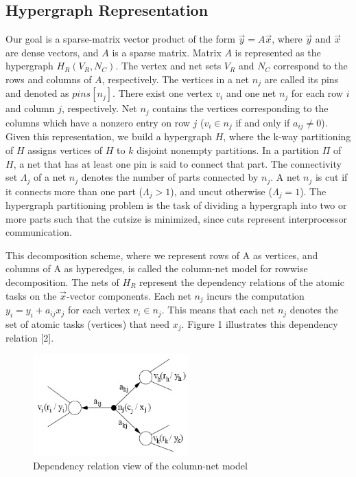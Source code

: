 \documentclass{article}
\begin{document}
\subsection{Hypergraph Representation}

Our goal is a sparse-matrix vector product of the form \(\vec{y} = A\vec{x}\), where \(\vec{y}\) and \(\vec{x}\) are dense vectors, and \(A\) is a sparse matrix. Matrix \(A\) is represented as the hypergraph \(H_{R}(V_{R}, N_{C})\). The vertex and net sets \(V_{R}\) and \(N_{C}\) correspond to the rows and columns of \(A\), respectively. The vertices in a net \(n_{j}\) are called its pins and denoted as \(pins[n_{j}]\). There exist one vertex \(v _{i}\) and one net \(n_{j}\) for each row \(i\) and column \(j\), respectively. Net \(n_{j}\) contains the vertices corresponding to the columns which have a nonzero entry on row \(j\) (\(v_{i} \in n_{j}\) if and only if \(a_{ij} \neq 0\)). Given this representation, we build a hypergraph \(H\), where the k-way partitioning of \(H\) assigns vertices of \(H\) to \(k\) disjoint nonempty partitions. In a partition \(\Pi\) of \(H\), a net that has at least one pin is said to connect that part. The connectivity set \(\Lambda_{j}\) of a net \(n_{j}\) denotes the number of parts connected by \(n _{j}\). A net \(n _{j}\) is cut if it connects more than one part (\(\Lambda_{j} > 1\)), and uncut otherwise (\(\Lambda_{j} = 1\)). The hypergraph partitioning problem is the task of dividing a hypergraph into two or more parts such that the cutsize is minimized, since cuts represent interprocessor communication.

This decomposition scheme, where we represent rows of A as vertices, and columns of A as hyperedges, is called the column-net model for rowwise decomposition. The nets of \(H_{R}\) represent the dependency relations of the atomic tasks on the \(\vec{x}\)-vector components. Each net \(n_{j}\) incurs the computation \(y_{i} = y_{i} + a_{ij}x_{j}\) for each vertex \(v_{i} \in n_{j}\). This means that each net \(n_{j}\) denotes the set of atomic tasks (vertices) that need \(x_{j}\). Figure 1 illustrates this dependency relation [2]. 

\begin{figure}[htb]
\begin{center}
\mbox{\includegraphics[width=60mm]{columnnet.JPG}}
\end{center}
\caption{Dependency relation view of the column-net model}
\label{fig1}
\end{figure}
\end{document}
